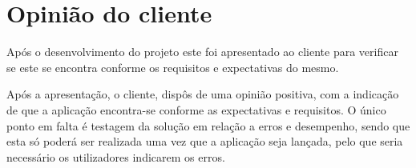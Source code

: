 \section{Opinião do cliente}

Após o desenvolvimento do projeto este foi apresentado ao cliente para verificar se este se encontra conforme os requisitos e expectativas do mesmo.

Após a apresentação, o cliente, dispôs de uma opinião positiva, com a indicação de que a aplicação encontra-se conforme as expectativas e requisitos. O único ponto em falta é testagem da solução em relação a erros e desempenho, sendo que esta só poderá ser realizada uma vez que a aplicação seja lançada, pelo que seria necessário os utilizadores indicarem os erros.